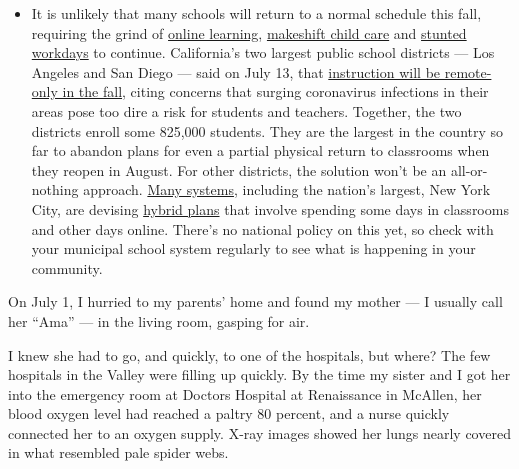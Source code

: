 \begin{itemize}
  \begin{itemize}
  \tightlist
  \item
    It is unlikely that many schools will return to a normal schedule
    this fall, requiring the grind of
    \href{https://www.nytimes3xbfgragh.onion/2020/06/05/us/coronavirus-education-lost-learning.html?action=click\&pgtype=Article\&state=default\&region=MAIN_CONTENT_3\&context=storylines_faq}{online
    learning},
    \href{https://www.nytimes3xbfgragh.onion/2020/05/29/us/coronavirus-child-care-centers.html?action=click\&pgtype=Article\&state=default\&region=MAIN_CONTENT_3\&context=storylines_faq}{makeshift
    child care} and
    \href{https://www.nytimes3xbfgragh.onion/2020/06/03/business/economy/coronavirus-working-women.html?action=click\&pgtype=Article\&state=default\&region=MAIN_CONTENT_3\&context=storylines_faq}{stunted
    workdays} to continue. California's two largest public school
    districts --- Los Angeles and San Diego --- said on July 13, that
    \href{https://www.nytimes3xbfgragh.onion/2020/07/13/us/lausd-san-diego-school-reopening.html?action=click\&pgtype=Article\&state=default\&region=MAIN_CONTENT_3\&context=storylines_faq}{instruction
    will be remote-only in the fall}, citing concerns that surging
    coronavirus infections in their areas pose too dire a risk for
    students and teachers. Together, the two districts enroll some
    825,000 students. They are the largest in the country so far to
    abandon plans for even a partial physical return to classrooms when
    they reopen in August. For other districts, the solution won't be an
    all-or-nothing approach.
    \href{https://bioethics.jhu.edu/research-and-outreach/projects/eschool-initiative/school-policy-tracker/}{Many
    systems}, including the nation's largest, New York City, are
    devising
    \href{https://www.nytimes3xbfgragh.onion/2020/06/26/us/coronavirus-schools-reopen-fall.html?action=click\&pgtype=Article\&state=default\&region=MAIN_CONTENT_3\&context=storylines_faq}{hybrid
    plans} that involve spending some days in classrooms and other days
    online. There's no national policy on this yet, so check with your
    municipal school system regularly to see what is happening in your
    community.
  \end{itemize}
\end{itemize}

On July 1, I hurried to my parents' home and found my mother --- I
usually call her ``Ama'' --- in the living room, gasping for air.

I knew she had to go, and quickly, to one of the hospitals, but where?
The few hospitals in the Valley were filling up quickly. By the time my
sister and I got her into the emergency room at Doctors Hospital at
Renaissance in McAllen, her blood oxygen level had reached a paltry 80
percent, and a nurse quickly connected her to an oxygen supply. X-ray
images showed her lungs nearly covered in what resembled pale spider
webs.

